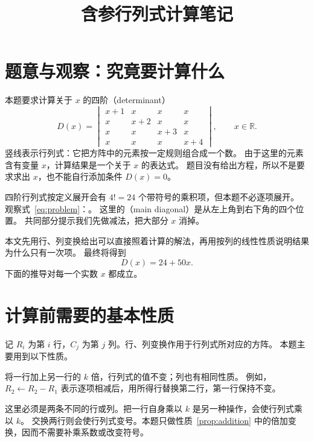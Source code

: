 \documentclass[UTF8,12pt,a4paper,fontset=fandol]{ctexart}
\title{含参行列式计算笔记}
\author{}
\date{}
\begin{document}
\maketitle

\section{题意与观察：究竟要计算什么}

本题要求计算关于 $x$ 的四阶（determinant）
\begin{equation}
  D(x)=\begin{vmatrix}
    x+1&x&x&x\\
    x&x+2&x&x\\
    x&x&x+3&x\\
    x&x&x&x+4
  \end{vmatrix},\qquad x\in\mathbb R.
  \label{eq:problem}
\end{equation}
竖线表示行列式：它把方阵中的元素按一定规则组合成一个数。
由于这里的元素含有变量 $x$，计算结果是一个关于 $x$ 的表达式。
题目没有给出方程，所以不是要求求出 $x$，也不能自行添加条件 $D(x)=0$。

四阶行列式按定义展开会有 $4!=24$ 个带符号的乘积项，但本题不必逐项展开。
观察式~\eqref{eq:problem}：。
这里的（main diagonal）是从左上角到右下角的四个位置。
共同部分提示我们先做减法，把大部分 $x$ 消掉。

本文先用行、列变换给出可以直接照着计算的解法，再用按列的线性性质说明结果为什么只有一次项。
最终将得到
\begin{equation}
  \boxed{D(x)=24+50x.}
  \label{eq:answer}
\end{equation}
下面的推导对每一个实数 $x$ 都成立。

\section{计算前需要的基本性质}
\label{sec:properties}

记 $R_i$ 为第 $i$ 行，$C_j$ 为第 $j$ 列。行、列变换作用于行列式所对应的方阵。
本题主要用到以下性质。

\begin{property}[倍加变换不改变行列式]
\label{prop:addition}
将一行加上另一行的 $k$ 倍，行列式的值不变；列也有相同性质。
例如，$R_2\leftarrow R_2-R_1$ 表示逐项相减后，用所得行替换第二行，第一行保持不变。
\end{property}

这里必须是两条不同的行或列。把一行自身乘以 $k$ 是另一种操作，会使行列式乘以 $k$。
交换两行则会使行列式变号。本题只做性质~\ref{prop:addition} 中的倍加变换，因而不需要补乘系数或改变符号。
\end{document}
